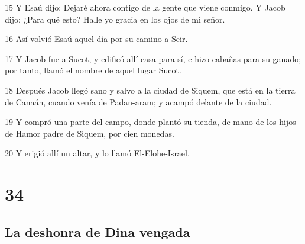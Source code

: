 \par 15 Y Esaú dijo: Dejaré ahora contigo de la gente que viene conmigo. Y Jacob dijo: ¿Para qué esto? Halle yo gracia en los ojos de mi señor.
\par 16 Así volvió Esaú aquel día por su camino a Seir.
\par 17 Y Jacob fue a Sucot, y edificó allí casa para sí, e hizo cabañas para su ganado; por tanto, llamó el nombre de aquel lugar Sucot.
\par 18 Después Jacob llegó sano y salvo a la ciudad de Siquem, que está en la tierra de Canaán, cuando venía de Padan-aram; y acampó delante de la ciudad.
\par 19 Y compró una parte del campo, donde plantó su tienda, de mano de los hijos de Hamor padre de Siquem, por cien monedas.
\par 20 Y erigió allí un altar, y lo llamó El-Elohe-Israel.

\chapter{34}

\section*{La deshonra de Dina vengada}

